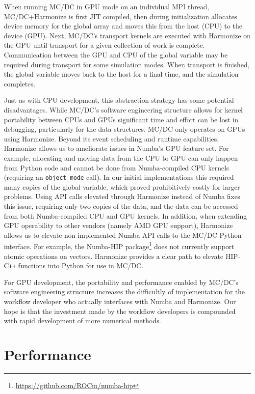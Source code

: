 When running MC/DC in GPU mode on an individual MPI thread, MC/DC+Harmonize is first JIT compiled, then  during initialization allocates device memory for the global array and moves this from the host (CPU) to the device (GPU).
Next, MC/DC's transport kernels are executed with Harmonize on the GPU until transport for a given collection of work is complete.
Communication between the GPU and CPU of the global variable may be required during transport for some simulation modes.
When transport is finished, the global variable moves back to the host for a final time, and the simulation completes.

Just as with CPU development, this abstraction strategy has some potential disadvantages.
While MC/DC's software engineering structure allows for kernel portability between CPUs and GPUs significant time and effort can be lost in debugging, particularly for the data structures.
MC/DC only operates on GPUs using Harmonize.
Beyond its event scheduling and runtime capabilities, Harmonize allows us to ameliorate issues in Numba's GPU feature set.
For example, allocating and moving data from the CPU to GPU can only happen from Python code and cannot be done from Numba-compiled CPU kernels (requiring an \texttt{object\_mode} call).
In our initial implementations this required many copies of the global variable, which proved prohibitively costly for larger problems.
Using API calls elevated through Harmonize instead of Numba fixes this issue, requiring only two copies of the data, and the data can be accessed from both Numba-compiled CPU and GPU kernels.
In addition, when extending GPU operability to other vendors (namely AMD GPU support), Harmonize allows us to elevate non-implemented Numba API calls to the MC/DC Python interface.
For example, the Numba-HIP package\footnote{\url{https://github.com/ROCm/numba-hip}} does not currently support atomic operations on vectors.
Harmonize provides a clear path to elevate HIP-C\texttt{++} functions into Python for use in MC/DC.

For GPU development, the portability and performance enabled by MC/DC's software engineering structure increases the difficultly of implementation for the workflow developer who actually interfaces with Numba and Harmonize.
Our hope is that the investment made by the workflow developers is compounded with rapid development of more numerical methods.


\section{Performance}
\label{sec:cise:performance}

